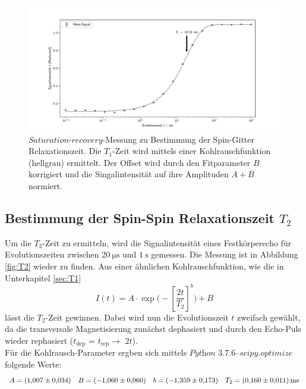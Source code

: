 \begin{figure}[H]
    \centering
    \includegraphics[width=\textwidth]{Auswertung/T1.pdf}
    \caption{$\textit{Saturation-recovery}$-Messung zu Bestimmung der Spin-Gitter
    Relaxationszeit. Die $T_1$-Zeit wird mittels einer Kohlrauschfunktion (hellgrau)
    ermittelt. Der Offset wird durch den Fitparameter $B$ korrigiert und die
    Singalintensität auf ihre Amplituden $A+B$ normiert.}
    \label{fig:T1}
\end{figure}

\subsection{Bestimmung der Spin-Spin Relaxationszeit $T_2$}
\label{sec:T2}
Um die $T_2$-Zeit zu ermitteln, wird die Signalintensität eines Festkörperecho
für Evolutionszeiten zwischen $\SI{20}{\micro\second}$ und $\SI{1}{\second}$
gemessen. Die Messung ist in Abbildung \ref{fig:T2} wieder zu finden.
Aus einer ähnlichen Kohlrauschfunktion, wie die in Unterkapitel \ref{sec:T1}
\begin{equation}
    I(t) = A \cdot \exp\biggl(-\left[\frac{2t}{T_2} \right]^b
    \biggr) + B
\end{equation}
\noindent
lässt die $T_2$-Zeit gewinnen. Dabei wird nun die Evolutionszeit $t$ zweifach gewählt,
da die transversale Magnetisierung zunächst dephasiert und durch den Echo-Puls
wieder rephasiert ($t_{\text{dep}}$ = $t_{\text{rep}} \rightarrow $ 2$t$).\\
Für die Kohlrausch-Parameter ergben sich mittels $\textit{Python 3.7.6--scipy.optimize}$
folgende Werte:
\begin{equation*}
  A = \SI{1,007\pm0,034}{}
  \quad
  B = \SI{-1,060\pm0,060}{}
  \quad
  b = \SI{-1,359\pm0,173}{}
  \quad
  T_2 = \SI{0.160\pm0.011}{\milli\second}
\end{equation*}

